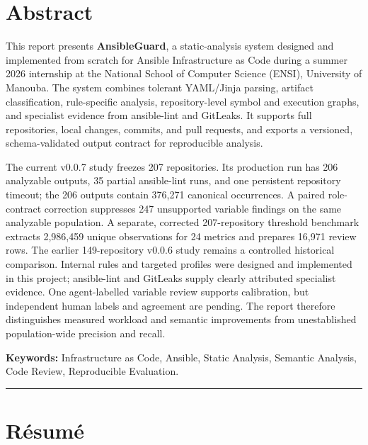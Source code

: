 \thispagestyle{empty}
\chapter*{Abstract}

\noindent\large
This report presents \textbf{AnsibleGuard}, a static-analysis system designed
and implemented from scratch for Ansible Infrastructure as Code during a
summer 2026 internship at the National School of Computer Science (ENSI),
University of Manouba. The system combines tolerant YAML/Jinja parsing,
artifact classification, rule-specific analysis, repository-level symbol and
execution graphs, and specialist evidence from ansible-lint and GitLeaks. It
supports full repositories, local changes, commits, and pull requests, and
exports a versioned, schema-validated output contract for reproducible analysis.

The current v0.0.7 study freezes 207 repositories. Its production run has 206
analyzable outputs, 35 partial ansible-lint runs, and one persistent repository
timeout; the 206 outputs contain 376,271 canonical occurrences. A paired
role-contract correction suppresses 247 unsupported variable findings on the
same analyzable population. A separate, corrected 207-repository threshold
benchmark extracts 2,986,459 unique observations for 24 metrics and prepares
16,971 review rows. The earlier 149-repository v0.0.6 study remains a
controlled historical comparison. Internal rules and targeted profiles were
designed and implemented in this project; ansible-lint and GitLeaks supply
clearly attributed specialist evidence. One agent-labelled variable review
supports calibration, but independent human labels and agreement are pending.
The report therefore distinguishes measured workload and semantic improvements
from unestablished population-wide precision and recall.

\medskip
\noindent\textbf{Keywords:} Infrastructure as Code, Ansible, Static Analysis,
Semantic Analysis, Code Review, Reproducible Evaluation.

\vspace{0.5cm}\noindent\rule{\textwidth}{0.4pt}\vspace{0.3cm}
\chapter*{Résumé}

